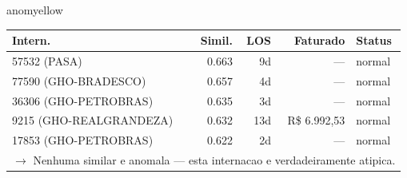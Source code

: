 \documentclass[a4paper,10pt]{article}
\begin{document}
\begin{anomalycard}[Internacao 7186 | GHO-PETROBRAS | MODERADO (z=2.02)]{anomyellow}
\begin{tabular}{l r r r l}\toprule\textbf{Intern.} & \textbf{Simil.} & \textbf{LOS} & \textbf{Faturado} & \textbf{Status} \\\midrule
57532 (PASA) & 0.663 & 9d & --- & \textcolor{jcubeblue}{normal} \\
77590 (GHO-BRADESCO) & 0.657 & 4d & --- & \textcolor{jcubeblue}{normal} \\
36306 (GHO-PETROBRAS) & 0.635 & 3d & --- & \textcolor{jcubeblue}{normal} \\
9215 (GHO-REALGRANDEZA) & 0.632 & 13d & R\$ 6.992,53 & \textcolor{jcubeblue}{normal} \\
17853 (GHO-PETROBRAS) & 0.622 & 2d & --- & \textcolor{jcubeblue}{normal} \\
\multicolumn{5}{l}{\textcolor{jcubeblue}{\small $\rightarrow$ Nenhuma similar e anomala --- esta internacao e verdadeiramente atipica.}} \\
\bottomrule\end{tabular}


\end{anomalycard}

\newpage
\end{document}
